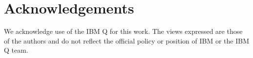 \section*{Acknowledgements}
We acknowledge use of the IBM Q for this work. The views expressed are those of the authors and do not reflect the official policy or position of IBM or the IBM Q team.

